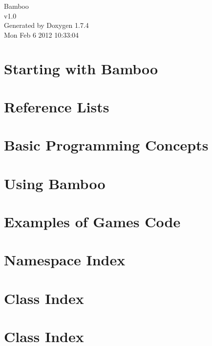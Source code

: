 \documentclass[a4paper]{book}
\begin{document}
\hypersetup{pageanchor=false}
\begin{titlepage}
\vspace*{7cm}
\begin{center}
{\Large Bamboo \\[1ex]\large v1.0 }\\
\vspace*{1cm}
{\large Generated by Doxygen 1.7.4}\\
\vspace*{0.5cm}
{\small Mon Feb 6 2012 10:33:04}\\
\end{center}
\end{titlepage}
\clearemptydoublepage
{}
\tableofcontents
\clearemptydoublepage
{}
\hypersetup{pageanchor=true}
\chapter{Starting with Bamboo}
\label{index}\hypertarget{index}{}
\chapter{Reference Lists}
\label{ReferenceLists}
\hypertarget{ReferenceLists}{}

\chapter{Basic Programming Concepts}
\label{ProgrammingBasics}
\hypertarget{ProgrammingBasics}{}

\chapter{Using Bamboo}
\label{UsingEnginePage}
\hypertarget{UsingEnginePage}{}

\chapter{Examples of Games Code}
\label{CodeProgramExamples}
\hypertarget{CodeProgramExamples}{}

\chapter{Namespace Index}

\chapter{Class Index}

\chapter{Class Index}

\end{document}
